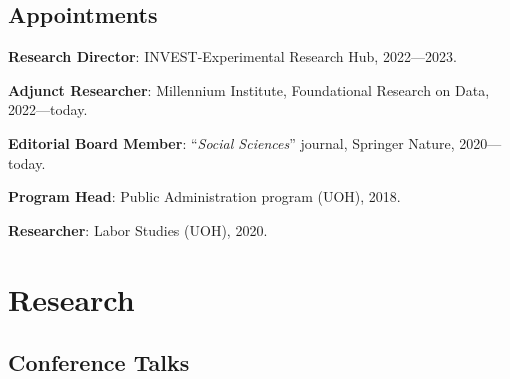 \documentclass[letterpaper]{article}
\renewenvironment{itemize}{
  \begin{list}{}{
    \setlength{\leftmargin}{1.5em}
  }
}{
  \end{list}
}
\begin{document}
{\unskip}

\subsection*{Appointments}

\begin{itemize}
  \item[\textcolor{gray}{\textbullet}] {\bf Research Director}: INVEST-Experimental Research Hub, 2022---2023.
  \item[\textcolor{gray}{\textbullet}] {\bf Adjunct Researcher}: Millennium Institute, Foundational Research on Data, 2022---today.
  \item[\textcolor{gray}{\textbullet}] {\bf Editorial Board Member}: ``\emph{Social Sciences}'' journal, Springer Nature, 2020---today.
  \item[\textcolor{gray}{\textbullet}] {\bf Program Head}: Public Administration program (UOH), 2018.
  \item[\textcolor{gray}{\textbullet}] {\bf Researcher}: Labor Studies (UOH), 2020.
\end{itemize}

\section*{Research}
{\unskip}



{}



\subsection*{Conference Talks}

{\unskip}


\end{document}
